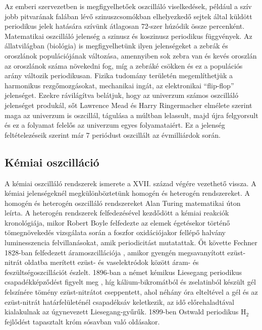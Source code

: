 Az emberi szervezetben is megfigyelhetőek oszcilláló viselkedések, például a szív jobb pitvarának falában lévő szinuszcsomókban elhelyezkedő sejtek által küldött periodikus jelek hatására  szívünk átlagosan 72-szer húzódik össze percenként. Matematikai oszcilláló jelenség a szinusz és koszinusz periodikus függvények. Az állatvilágban (biológia) is megfigyelhetünk ilyen jelenségeket a zebrák és oroszlánok populációjának változása, amennyiben sok zebra van és kevés oroszlán az oroszlánok száma növekedni fog, míg a zebráké csökken és ez a populációs arány változik periodikusan. Fizika tudomány területén megemlíthetjük a harmonikus rezgőmozgásokat, mechanikai ingát,  az elektronikai “flip-flop” jelenséget. Ezekre rávilágítva belátjuk, hogy az univerzum számos oszcilláló jelenséget produkál, sőt Lawrence Mead és Harry Ringermacher elmélete \cite{ringermacher2017strong}  szerint maga az univerzum is oszcillál, tágulása a múltban lelassult, majd újra felgyorsult és ez a folyamat felelős az univerzum egyes folyamataiért. Ez a jelenség feltételezéseik szerint már 7 periódust oszcillált az évmilliárdok során.

\subsection{Kémiai oszcilláció}
A kémiai oszcilláló rendszerek ismerete a XVII. század végére vezethető vissza.  A kémiai jelenségeknél megkülönböztetünk homogén és heterogén rendszereket. A homogén és heterogén oszcilláló rendszereket Alan Turing matematikai úton leírta.\cite{turing1952chemical} A heterogén rendszerek felfedezésével kezdődött a kémiai reakciók kronológiája, mikor Robert Boyle \cite{harvey1957history} felfedezte az elemek égetésekor történő tömegnövekedés vizsgálata során a foszfor oxidációjakor fellépő halvány luminesszencia felvillanásokat, amik periodicitást mutatattak. Őt követte  Fechner 1828-ban felfedezett áramoszcillációja \cite{fechner1828schweigg}, amikor gyengén megsavanyított ezüst-nitrát oldatba merített ezüst- és vaselektródok között áram- és feszültségoszcillációt észlelt. 1896-ban a német kémikus Liesegang periodikus csapadékképződést figyelt meg \cite{liesegang1896ueber}, híg kálium-bikromátból és zselatinból készült gél felszínére tömény ezüst-nitrátot cseppentett, ahol néhány óra elteltével a gél és az ezüst-nitrát határfelületénél csapadéksáv keletkezik, az idő előrehaladtával kialakulnak az úgynevezett Liesegang-gyűrűk. 1899-ben Ostwald \cite{ostwald1899jacobus} periodikus H$_2$ fejlődést tapasztalt króm sósavban való oldásakor.

